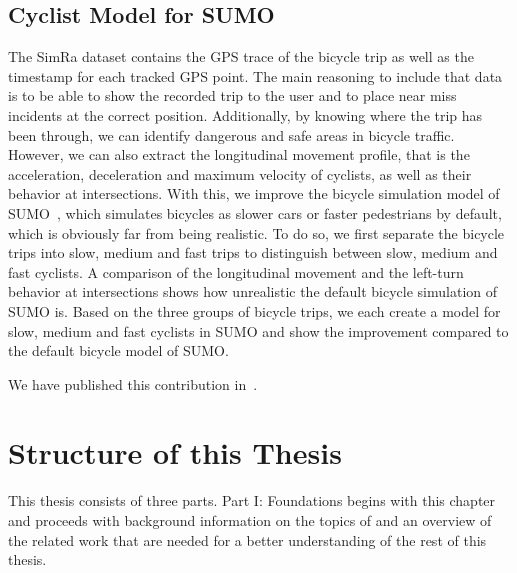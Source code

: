 \subsection{Cyclist Model for SUMO}
\label{subsec:sumo_contribution}
The SimRa dataset contains the GPS trace of the bicycle trip as well as the timestamp for each tracked GPS point.
The main reasoning to include that data is to be able to show the recorded trip to the user and to place near miss incidents at the correct position.
Additionally, by knowing where the trip has been through, we can identify dangerous and safe areas in bicycle traffic.
However, we can also extract the longitudinal movement profile, that is the acceleration, deceleration and maximum velocity of cyclists, as well as their behavior at intersections.
With this, we improve the bicycle simulation model of SUMO~\cite{lopez2018microscopic}, which simulates bicycles as slower cars or faster pedestrians by default, which is obviously far from being realistic.
To do so, we first separate the bicycle trips into slow, medium and fast trips to distinguish between slow, medium and fast cyclists.
A comparison of the longitudinal movement and the left-turn behavior at intersections shows how unrealistic the default bicycle simulation of SUMO is.
Based on the three groups of bicycle trips, we each create a model for slow, medium and fast cyclists in SUMO and show the improvement compared to the default bicycle model of SUMO.

We have published this contribution in~\cite{karakaya2022realistic,karakaya2023achieving}.

\section{Structure of this Thesis}
\label{sec:structure}

This thesis consists of three parts. Part I: Foundations begins with this chapter and proceeds with background information on the topics of  and an overview of the related work that are needed for a better understanding of the rest of this thesis. 